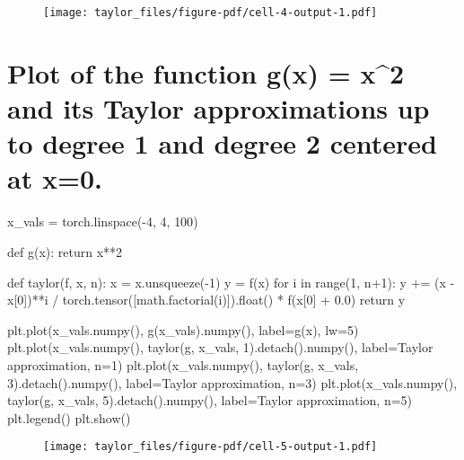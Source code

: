 \documentclass[
  letterpaper,
  DIV=11,
  numbers=noendperiod]{scrartcl}
\newenvironment{Shaded}{\begin{snugshade}}{\end{snugshade}}
\newcommand{\BuiltInTok}[1]{\textcolor[rgb]{0.00,0.23,0.31}{#1}}
\newcommand{\ControlFlowTok}[1]{\textcolor[rgb]{0.00,0.23,0.31}{#1}}
\newcommand{\DecValTok}[1]{\textcolor[rgb]{0.68,0.00,0.00}{#1}}
\newcommand{\FloatTok}[1]{\textcolor[rgb]{0.68,0.00,0.00}{#1}}
\newcommand{\KeywordTok}[1]{\textcolor[rgb]{0.00,0.23,0.31}{#1}}
\newcommand{\NormalTok}[1]{\textcolor[rgb]{0.00,0.23,0.31}{#1}}
\newcommand{\OperatorTok}[1]{\textcolor[rgb]{0.37,0.37,0.37}{#1}}
\newcommand{\StringTok}[1]{\textcolor[rgb]{0.13,0.47,0.30}{#1}}
\begin{document}
\begin{figure}[H]

{\centering \texttt{[image: taylor\_files/figure-pdf/cell-4-output-1.pdf]}

}

\end{figure}

\hypertarget{plot-of-the-function-gx-x2-and-its-taylor-approximations-up-to-degree-1-and-degree-2-centered-at-x0.}{%
\section{Plot of the function g(x) = x\^{}2 and its Taylor
approximations up to degree 1 and degree 2 centered at
x=0.}\label{plot-of-the-function-gx-x2-and-its-taylor-approximations-up-to-degree-1-and-degree-2-centered-at-x0.}}

\begin{Shaded}
\begin{Highlighting}[]
\NormalTok{x\_vals }\OperatorTok{=}\NormalTok{ torch.linspace(}\OperatorTok{{-}}\DecValTok{4}\NormalTok{, }\DecValTok{4}\NormalTok{, }\DecValTok{100}\NormalTok{)}

\KeywordTok{def}\NormalTok{ g(x):}
    \ControlFlowTok{return}\NormalTok{ x}\OperatorTok{**}\DecValTok{2}

\KeywordTok{def}\NormalTok{ taylor(f, x, n):}
\NormalTok{    x }\OperatorTok{=}\NormalTok{ x.unsqueeze(}\OperatorTok{{-}}\DecValTok{1}\NormalTok{)}
\NormalTok{    y }\OperatorTok{=}\NormalTok{ f(x)}
    \ControlFlowTok{for}\NormalTok{ i }\KeywordTok{in} \BuiltInTok{range}\NormalTok{(}\DecValTok{1}\NormalTok{, n}\OperatorTok{+}\DecValTok{1}\NormalTok{):}
\NormalTok{        y }\OperatorTok{+=}\NormalTok{ (x }\OperatorTok{{-}}\NormalTok{ x[}\DecValTok{0}\NormalTok{])}\OperatorTok{**}\NormalTok{i }\OperatorTok{/}\NormalTok{ torch.tensor([math.factorial(i)]).}\BuiltInTok{float}\NormalTok{() }\OperatorTok{*}\NormalTok{ f(x[}\DecValTok{0}\NormalTok{] }\OperatorTok{+} \FloatTok{0.0}\NormalTok{)}
    \ControlFlowTok{return}\NormalTok{ y}


\NormalTok{plt.plot(x\_vals.numpy(), g(x\_vals).numpy(), label}\OperatorTok{=}\StringTok{\textquotesingle{}g(x)\textquotesingle{}}\NormalTok{, lw}\OperatorTok{=}\DecValTok{5}\NormalTok{)}
\NormalTok{plt.plot(x\_vals.numpy(), taylor(g, x\_vals, }\DecValTok{1}\NormalTok{).detach().numpy(), label}\OperatorTok{=}\StringTok{\textquotesingle{}Taylor approximation, n=1\textquotesingle{}}\NormalTok{)}
\NormalTok{plt.plot(x\_vals.numpy(), taylor(g, x\_vals, }\DecValTok{3}\NormalTok{).detach().numpy(), label}\OperatorTok{=}\StringTok{\textquotesingle{}Taylor approximation, n=3\textquotesingle{}}\NormalTok{)}
\NormalTok{plt.plot(x\_vals.numpy(), taylor(g, x\_vals, }\DecValTok{5}\NormalTok{).detach().numpy(), label}\OperatorTok{=}\StringTok{\textquotesingle{}Taylor approximation, n=5\textquotesingle{}}\NormalTok{)}
\NormalTok{plt.legend()}
\NormalTok{plt.show()}
\end{Highlighting}
\end{Shaded}

\begin{figure}[H]

{\centering \texttt{[image: taylor\_files/figure-pdf/cell-5-output-1.pdf]}

}

\end{figure}
\end{document}
